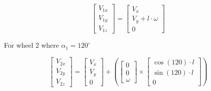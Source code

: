 \documentclass[answers]{exam}
\begin{document}
\begin{questions}
\begin{parts}
\begin{solution}
            \begin{equation} \label{eq:1}
                \begin{bmatrix}
                    V_{1x}  \\
                    V_{1y} \\
                    V_{1z}
                \end{bmatrix}
                = \begin{bmatrix}
                    V_x \\
                    V_y + l \cdot \omega\\
                    0
                \end{bmatrix} 
            \end{equation}
            

            For wheel 2 where $\alpha_1 = 120^\circ$

            \begin{equation*}
                \begin{bmatrix}
                    V_{2x}  \\
                    V_{2y} \\
                    V_{2z}
                \end{bmatrix}
                = \begin{bmatrix}
                    V_x \\
                    V_y \\
                    0
                \end{bmatrix} 
                + \left(\begin{bmatrix}
                    0 \\
                    0 \\
                    \omega
                \end{bmatrix} \times \begin{bmatrix}
                    \cos(120) \cdot l \\
                    \sin(120) \cdot l \\
                    0
                \end{bmatrix}\right)
            \end{equation*}


\end{solution}
\end{parts}
\end{questions}
\end{document}
